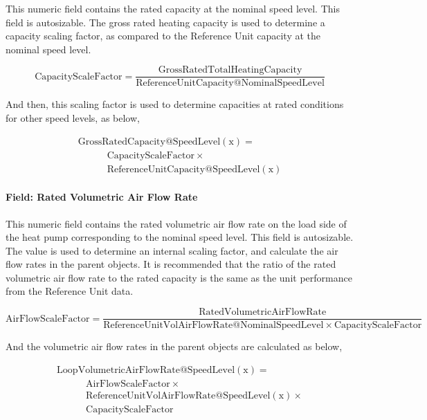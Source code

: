 This numeric field contains the rated capacity at the nominal speed level. This field is autosizable. The gross rated heating capacity is used to determine a capacity scaling factor, as compared to the Reference Unit capacity at the nominal speed level.

\begin{equation}
\mathrm{CapacityScaleFactor} = \frac{{{\mathrm{Gross RatedTotalHeatingCapacity}}}}{{{\mathrm{ReferenceUnitCapacity}}@{\mathrm{NominalSpeedLevel}}}}
\end{equation}

And then, this scaling factor is used to determine capacities at rated conditions for other speed levels, as below,

\begin{equation}
  \begin{array}{l}
    \mathrm{Gross RatedCapacity} @ \mathrm{SpeedLevel} \left( \mathrm{x} \right) = \\
    \quad \quad \quad \mathrm{CapacityScaleFactor} \times \\
    \quad \quad \quad \mathrm{ReferenceUnitCapacity} @ \mathrm{SpeedLevel}(\mathrm{x})
  \end{array}
\end{equation}

\paragraph{Field: Rated Volumetric Air Flow Rate}\label{field-rated-volumetric-air-flow-rate}

This numeric field contains the rated volumetric air flow rate on the load side of the heat pump corresponding to the nominal speed level. This field is autosizable. The value is used to determine an internal scaling factor, and calculate the air flow rates in the parent objects. It is recommended that the ratio of the rated volumetric air flow rate to the rated capacity is the same as the unit performance from the Reference Unit data.

\begin{equation}
{\mathrm{AirFlowScaleFactor}} = \frac{{{\mathrm{RatedVolumetricAirFlowRate}}}}{{{\mathrm{ReferenceUnitVolAirFlowRate}}@{\mathrm{NominalSpeedLevel}} \times {\mathrm{CapacityScaleFactor}}}}
\end{equation}

And the volumetric air flow rates in the parent objects are calculated as below,

\begin{equation}
  \begin{array}{l}
    {\mathrm{LoopVolumetricAirFlowRate}}@{\mathrm{SpeedLevel}}\left( {\mathrm{x}} \right) = \\
    \quad \quad \quad {\mathrm{AirFlowScaleFactor}} \times \\
    \quad \quad \quad {\mathrm{ReferenceUnitVolAirFlowRate}}@{\mathrm{SpeedLevel}}({\mathrm{x}}) \times \\
    \quad   \quad \quad {\mathrm{CapacityScaleFactor}}
  \end{array}
\end{equation}

